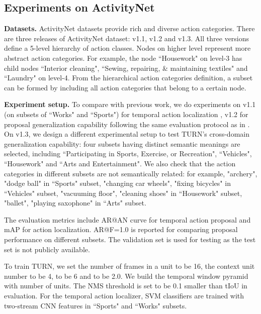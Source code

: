 \documentclass[10pt,twocolumn,letterpaper]{article}
\begin{document}
\vspace{-1.5mm}
\subsection{Experiments on ActivityNet}
\textbf{Datasets.} ActivityNet datasets provide rich and diverse action categories. There are three releases of ActivityNet dataset: v1.1, v1.2 and v1.3.
All three versions define a 5-level hierarchy of action classes. Nodes on higher level represent more abstract action categories. For example, the node ``Housework" on level-3 has child nodes ``Interior cleaning", ``Sewing, repairing, \& maintaining textiles" and ``Laundry" on level-4. From the hierarchical action categories definition, a subset can be formed by including all action categories that belong to a certain node.

\textbf{Experiment setup.} 
To compare with previous work, we do experiments on v1.1 (on subsets of ``Works" and ``Sports") for temporal action localization \cite{caba2015activitynet, Yeung_2016_CVPR}, v1.2 for proposal generalization capability following  the same evaluation protocol as in \cite{escorcia2016daps}. On v1.3, we design a different experimental setup to test TURN's cross-domain generalization capability: four subsets having distinct semantic meanings are selected, including ``Participating in Sports, Exercise, or Recreation", ``Vehicles", ``Housework" and ``Arts and Entertainment". We also check that the action categories in different subsets are not semantically related: for example, "archery", "dodge ball" in ``Sports" subset, "changing car wheels", "fixing bicycles" in ``Vehicles" subset, "vacuuming floor", "cleaning shoes" in ``Housework" subset, "ballet", "playing saxophone" in ``Arts" subset. 



The evaluation metrics include AR@AN curve for temporal action proposal and mAP for action localization. AR@F=1.0 is reported for comparing proposal performance on different subsets. The validation set is used for testing as the test set is not publicly available.

To train TURN, we set the number of frames in a unit  to be 16, the context unit number  to be 4,  to be 6 and  to be 2.0. We build the temporal window pyramid with  number of units. The NMS threshold is set to be 0.1 smaller than tIoU in evaluation. For the temporal action localizer, SVM classifiers are trained with two-stream CNN features in ``Sports"  and ``Works" subsets.
\end{document}
